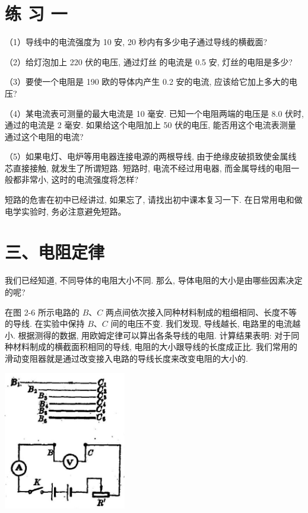 \documentclass[10pt]{article}
\begin{document}
\section*{练 习 一}

（1）导线中的电流强度为 10 安, 20 秒内有多少电子通过导线的横截面?

（2）给灯泡加上 220 伏的电压, 通过灯丝 的电流是 0.5 安, 灯丝的电阻是多少?

（3）要使一个电阻是 190 欧的导体内产生 0.2 安的电流, 应该给它加上多大的电压?

（4）某电流表可测量的最大电流是 10 毫安. 已知一个电阻两端的电压是 8.0 伏时, 通过的电流是 2 毫安. 如果给这个电阻加上 50 伏的电压, 能否用这个电流表测量通过这个电阻的电流?

（5）如果电灯、电炉等用电器连接电源的两根导线, 由于绝缘皮破损致使金属线芯直接接触, 就发生了所谓短路. 短路时, 电流不经过用电器, 而金属导线的电阻一般都非常小, 这时的电流强度将怎样?

短路的危害在初中已经讲过, 如果忘了, 请找出初中课本复习一下. 在日常用电和做电学实验时, 务必注意避免短路。

\section*{三、电阻定律}

我们已经知道, 不同导体的电阻大小不同. 那么, 导体电阻的大小是由哪些因素决定的呢?

在图 2-6 所示电路的 \(B\text{、}C\) 两点间依次接入同种材料制成的粗细相同、长度不等的导线. 在实验中保持 \(B\text{、}C\) 间的电压不变. 我们发现, 导线越长, 电路里的电流越小. 根据测得的数据, 用欧姆定律可以算出各条导线的电阻. 计算结果表明: 对于同种材料制成的横截面积相同的导线, 电阻的大小跟导线的长度成正比. 我们常用的滑动变阻器就是通过改变接入电路的导线长度来改变电阻的大小的.

\begin{center}
\includegraphics[max width=0.4\textwidth]{images/01913056-1f15-74d8-9184-9aab52c9d66b_65_385978.jpg}
\end{center}
\end{document}
